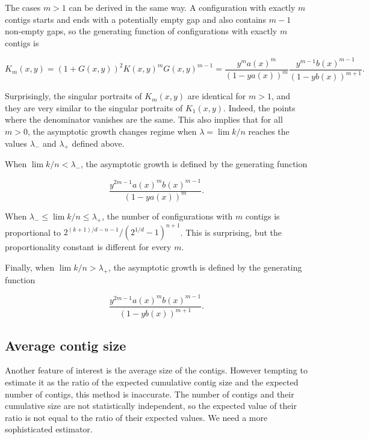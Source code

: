 \documentclass{article}
\begin{document}
The cases $m > 1$ can be derived in the same way. A configuration with
exactly $m$ contigs starts and ends with a potentially empty gap and
also contains $m-1$ non-empty gaps, so the generating function of
configurations with exactly $m$ contigs is

\begin{equation*}
K_m(x,y) = (1+G(x,y))^2K(x,y)^mG(x,y)^{m-1} =
\frac{y^ma(x)^m}{\left(1-ya(x)\right)^m}
\frac{y^{m-1}b(x)^{m-1}}{\left(1-yb(x)\right)^{m+1}}.
\end{equation*}

Surprisingly, the singular portraits of $K_m(x,y)$ are identical for $m >
1$, and they are very similar to the singular portraits of $K_1(x,y)$.
Indeed, the points where the denominator vanishes are the same. This also
implies that for all $m > 0$, the asymptotic growth changes regime when
$\lambda = \lim k/n$ reaches the values $\lambda_-$ and $\lambda_+$
defined above.

When $\lim k/n < \lambda_-$, the asymptotic growth is defined by the
generating function

\begin{equation*}
\frac{y^{2m-1}a(x)^mb(x)^{m-1}}{\left(1-ya(x)\right)^m}.
\end{equation*}

When $\lambda_- \leq \lim k/n \leq \lambda_+$, the number of
configurations with $m$ contigs is proportional to
$2^{(k+1)/d-n-1}/(2^{1/d}-1)^{n+1}$. This is surprising, but the
proportionality constant is different for every $m$.


Finally, when $\lim k/n > \lambda_+$, the asymptotic growth is defined by
the generating function

\begin{equation*}
\frac{y^{2m-1}a(x)^mb(x)^{m-1}}{\left(1-yb(x)\right)^{m+1}}.
\end{equation*}




\subsection{Average contig size}
\label{subsec:avctsz}

Another feature of interest is the average size of the contigs. However
tempting to estimate it as the ratio of the expected cumulative contig
size and the expected number of contigs, this method is inaccurate. The
number of contigs and their cumulative size are not statistically
independent, so the expected value of their ratio is not equal to the
ratio of their expected values. We need a more sophisticated estimator.
\end{document}
